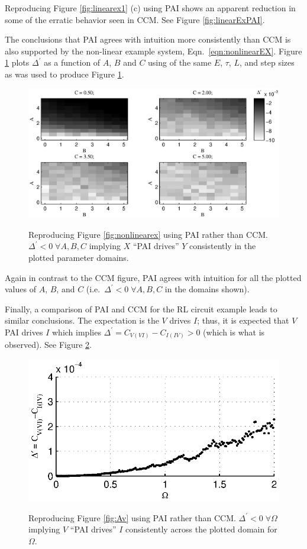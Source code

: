 \documentclass[twocolumn,aps,pre,groupedaddress]{revtex4-1}
\begin{document}
Reproducing Figure \ref{fig:linearex1} (c) using PAI shows an apparent reduction in some of the erratic behavior seen in CCM.  See Figure \ref{fig:linearExPAI}.

The conclusions that PAI agrees with intuition more consistently than CCM is also supported by the non-linear example system, Eqn.\ \ref{eqn:nonlinearEX}.  Figure \ref{fig:nonlinearEXPAI} plots $\Delta^\prime$ as a function of $A$, $B$ and $C$ using of the same $E$, $\tau$, $L$, and step sizes as was used to produce Figure \ref{fig:nonlinearEXPAI}.
\begin{figure}[ht]
\includegraphics[scale=0.5]{NonLinearPAIEx.eps} \\
\caption{Reproducing Figure \ref{fig:nonlinearex} using PAI rather than CCM.  $\Delta^\prime<0\;\forall A,B,C$ implying $X$ ``PAI drives'' $Y$ consistently in the plotted parameter domains.}
\label{fig:nonlinearEXPAI}
\end{figure}
Again in contrast to the CCM figure, PAI agrees with intuition for all the plotted values of $A$, $B$, and $C$ (i.e.\ $\Delta^\prime<0\;\forall A,B,C$ in the domains shown).

Finally, a comparison of PAI and CCM for the RL circuit example leads to similar conclusions.  The expectation is the $V$ drives $I$; thus, it is expected that $V$ PAI drives $I$ which implies $\Delta^\prime = C_{V(VI)} - C_{I(IV)} > 0$ (which is what is observed).  See Figure \ref{fig:AvPAI}.
\begin{figure}[ht]
\includegraphics[scale=0.8]{RLCircuitVaryV_FreqPAI.eps} \\
\caption{Reproducing Figure \ref{fig:Av} using PAI rather than CCM.  $\Delta^\prime<0\;\forall \Omega$ implying $V$ ``PAI drives'' $I$ consistently across the plotted domain for $\Omega$.}
\label{fig:AvPAI}
\end{figure}
\end{document}
